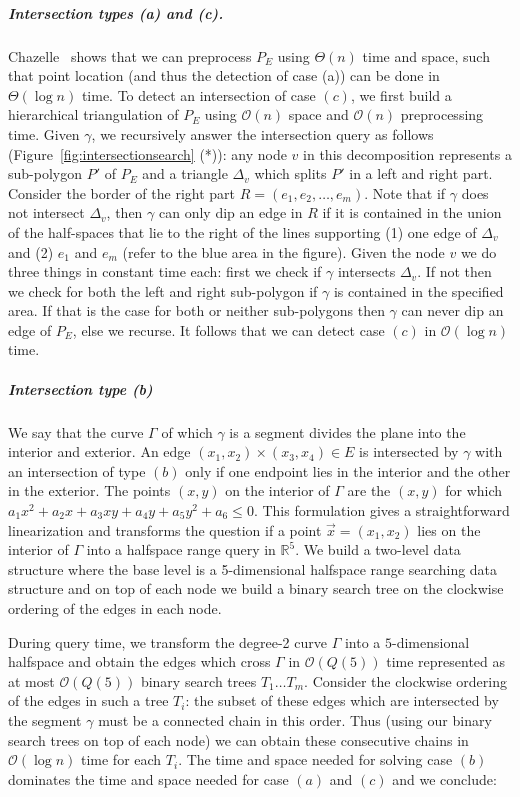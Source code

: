 \documentclass[UKenglish]{lipics-v2019}
\begin{document}
%
\subparagraph{Intersection types (a) and (c).}
Chazelle~\cite{FRANK} shows that we can preprocess $P_E$ using $\Theta(n)$ time and space, such that point location (and thus the detection of case (a)) can be done in $\Theta(\log n)$ time. To detect an intersection of case $(c)$, we first build a hierarchical triangulation of $P_E$ using $\mathcal{O}(n)$ space and $\mathcal{O}(n)$ preprocessing time. Given $\gamma$, we recursively answer the intersection query as follows (Figure~\ref{fig:intersectionsearch} (*)): any node $v$ in this decomposition represents a sub-polygon $P'$ of $P_E$ and a triangle $\Delta_v$ which splits $P'$ in a left and right part. Consider the border of the right part $R = (e_1, e_2, \ldots, e_m)$. Note that if $\gamma$ does not intersect $\Delta_v$, then $\gamma$ can only dip an edge in $R$ if it is contained in the union of the half-spaces that lie to the right of the lines supporting (1) one edge of $\Delta_v$ and (2) $e_1$ and $e_m$ (refer to the blue area in the figure). Given the node $v$ we do three things in constant time each: first we check if $\gamma$ intersects $\Delta_v$. If not then we check for both the left and right sub-polygon if $\gamma$ is contained in the specified area. If that is the case for both or neither sub-polygons then $\gamma$ can never dip an edge of $P_E$, else we recurse. It follows that we can detect case $(c)$ in $\mathcal{O}(\log n)$ time.

\subparagraph{Intersection type (b)}

We say that the curve $\Gamma$ of which $\gamma$ is a segment divides the plane into the interior and exterior. An edge $(x_1, x_2) \times (x_3, x_4) \in E$ is intersected by $\gamma$ with an intersection of type $(b)$ only if one endpoint lies in the interior and the other in the exterior. The points $(x,y)$ on the interior of $\Gamma$ are the $(x, y)$ for which $a_1 x^2 + a_2 x + a_3 xy + a_4 y + a_5 y^2 + a_6 \le 0$. This formulation gives a straightforward linearization and transforms the question if a point $\vec{x} = (x_1, x_2)$ lies on the interior of $\Gamma$ into a halfspace range query in $\mathbb{R}^5$. 
We build a two-level data structure where the base level is a 5-dimensional halfspace range searching data structure and on top of each node we build a binary search tree on the clockwise ordering of the edges in each node.

During query time, we transform the degree-2 curve $\Gamma$ into a $5$-dimensional halfspace and obtain the edges which cross $\Gamma$ in $\mathcal{O}(Q(5))$ time represented as at most $\mathcal{O}(Q(5))$ binary search trees $T_1 \ldots T_m$. Consider the clockwise ordering of the edges in such a tree $T_i$: the subset of these edges which are intersected by the segment $\gamma$ must be a connected chain in this order. Thus (using our binary search trees on top of each node) we can obtain these consecutive chains in $\mathcal{O}(\log n)$ time for each $T_i$. The time and space needed for solving case $(b)$ dominates the time and space needed for case $(a)$ and $(c)$ and we conclude:
\end{document}
